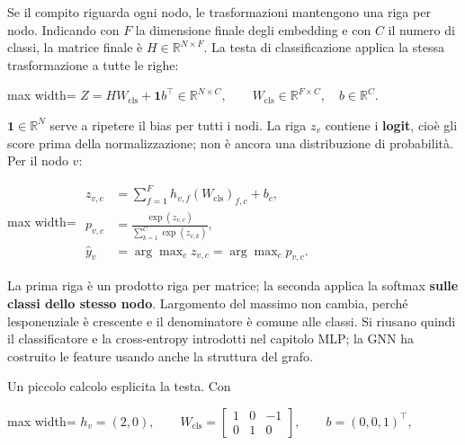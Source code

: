 \documentclass[11pt,a4paper,oneside,openany]{book}
\begin{document}
Se il compito riguarda ogni nodo, le trasformazioni mantengono una riga per nodo. Indicando con \(F\) la dimensione finale degli embedding e con \(C\) il numero di classi, la matrice finale è \(H\in\mathbb R^{N\times F}\). La testa di classificazione applica la stessa trasformazione a tutte le righe:

\begin{center}
\begin{adjustbox}{max width=\linewidth}
$\displaystyle \boxed{Z=HW_{\mathrm{cls}}+\mathbf 1b^\top\in\mathbb R^{N\times C},\qquad
W_{\mathrm{cls}}\in\mathbb R^{F\times C},\quad b\in\mathbb R^C.}$
\end{adjustbox}
\end{center}

\(\mathbf 1\in\mathbb R^N\) serve a ripetere il bias per tutti i nodi. La riga \(z_v\) contiene i \textbf{logit}, cioè gli score prima della normalizzazione; non è ancora una distribuzione di probabilità. Per il nodo \(v\):

\begin{center}
\begin{adjustbox}{max width=\linewidth}
$\displaystyle \begin{aligned}
z_{v,c}&=\sum_{f=1}^Fh_{v,f}(W_{\mathrm{cls}})_{f,c}+b_c,\\
p_{v,c}&=\frac{\exp(z_{v,c})}{\sum_{k=1}^C\exp(z_{v,k})},\\
\widehat y_v&=\arg\max_c z_{v,c}=\arg\max_c p_{v,c}.
\end{aligned}$
\end{adjustbox}
\end{center}

La prima riga è un prodotto riga per matrice; la seconda applica la softmax \textbf{sulle classi dello stesso nodo}. L\textquotesingle argomento del massimo non cambia, perché l\textquotesingle esponenziale è crescente e il denominatore è comune alle classi. Si riusano quindi il classificatore e la cross-entropy introdotti nel capitolo MLP; la GNN ha costruito le feature usando anche la struttura del grafo.

Un piccolo calcolo esplicita la testa. Con

\begin{center}
\begin{adjustbox}{max width=\linewidth}
$\displaystyle h_v=(2,0),\qquad W_{\mathrm{cls}}=
\begin{bmatrix}1&0&-1\\0&1&0\end{bmatrix},\qquad b=(0,0,1)^\top,$
\end{adjustbox}
\end{center}
\end{document}
